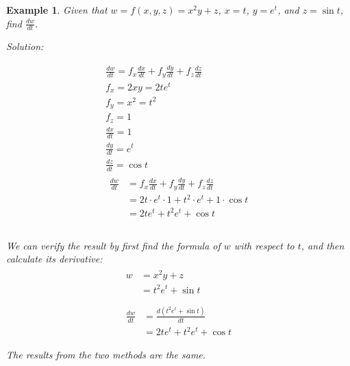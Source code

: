 \documentclass{article}
\newtheorem{example}{Example}
\begin{document}
\begin{example}
  Given that $w = f(x, y, z) = x^2y + z$, $x = t$, $y = e^t$, and $z = \sin t$, 
  find $\frac{dw}{dt}$.

  Solution:

  \begin{gather*}
    \frac{dw}{dt} = f_x \frac{dx}{dt} + f_y \frac{dy}{dt} + f_z \frac{dz}{dt} \\
    f_x = 2xy = 2te^t \\
    f_y = x^2 = t^2 \\
    f_z = 1 \\
    \frac{dx}{dt} = 1 \\
    \frac{dy}{dt} = e^t \\
    \frac{dz}{dt} = \cos t \\
    \begin{split}
      \frac{dw}{dt} &= f_x \frac{dx}{dt} + f_y \frac{dy}{dt} + f_z \frac{dz}{dt} \\
                    &= 2t \cdot e^t \cdot 1 + t^2 \cdot e^t + 1 \cdot \cos t \\
                    &= 2te^t + t^2e^t + \cos t \\
    \end{split} \\
  \end{gather*}

  We can verify the result by first find the formula of $w$ with respect to $t$, 
  and then calculate its derivative:
  \begin{gather*}
    \begin{split}
      w &= x^2y + z \\
        &= t^2e^t + \sin t \\
    \end{split} \\
    \begin{split}
      \frac{dw}{dt} &= \frac{d(t^2e^t + \sin t)}{dt} \\
                    &= 2te^t + t^2e^t + \cos t \\
    \end{split} \\
  \end{gather*}
  The results from the two methods are the same.
\end{example}
\end{document}
